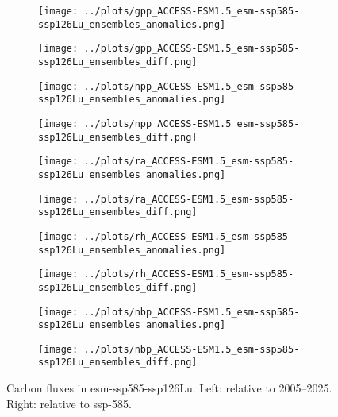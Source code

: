 \documentclass[]{article}
\begin{document}
\begin{figure}[H]
    \centering
    \begin{subfigure}[b]{0.4\linewidth}
        \texttt{[image: ../plots/gpp\_ACCESS-ESM1.5\_esm-ssp585-ssp126Lu\_ensembles\_anomalies.png]}
    \end{subfigure}
    \begin{subfigure}[b]{0.4\linewidth}
        \texttt{[image: ../plots/gpp\_ACCESS-ESM1.5\_esm-ssp585-ssp126Lu\_ensembles\_diff.png]}
    \end{subfigure}
    \begin{subfigure}[b]{0.4\linewidth}
        \texttt{[image: ../plots/npp\_ACCESS-ESM1.5\_esm-ssp585-ssp126Lu\_ensembles\_anomalies.png]}
    \end{subfigure}
    \begin{subfigure}[b]{0.4\linewidth}
        \texttt{[image: ../plots/npp\_ACCESS-ESM1.5\_esm-ssp585-ssp126Lu\_ensembles\_diff.png]}
    \end{subfigure}
    \begin{subfigure}[b]{0.4\linewidth}
        \texttt{[image: ../plots/ra\_ACCESS-ESM1.5\_esm-ssp585-ssp126Lu\_ensembles\_anomalies.png]}
    \end{subfigure}
    \begin{subfigure}[b]{0.4\linewidth}
        \texttt{[image: ../plots/ra\_ACCESS-ESM1.5\_esm-ssp585-ssp126Lu\_ensembles\_diff.png]}
    \end{subfigure}
    \begin{subfigure}[b]{0.4\linewidth}
        \texttt{[image: ../plots/rh\_ACCESS-ESM1.5\_esm-ssp585-ssp126Lu\_ensembles\_anomalies.png]}
    \end{subfigure}
    \begin{subfigure}[b]{0.4\linewidth}
        \texttt{[image: ../plots/rh\_ACCESS-ESM1.5\_esm-ssp585-ssp126Lu\_ensembles\_diff.png]}
    \end{subfigure}
    \begin{subfigure}[b]{0.4\linewidth}
        \texttt{[image: ../plots/nbp\_ACCESS-ESM1.5\_esm-ssp585-ssp126Lu\_ensembles\_anomalies.png]}
    \end{subfigure}
    \begin{subfigure}[b]{0.4\linewidth}
        \texttt{[image: ../plots/nbp\_ACCESS-ESM1.5\_esm-ssp585-ssp126Lu\_ensembles\_diff.png]}
    \end{subfigure}
    \caption{Carbon fluxes in esm-ssp585-ssp126Lu.  Left: relative to 2005–2025. Right: relative to ssp-585.}
    \label{fig:cflux}
\end{figure}
\end{document}
